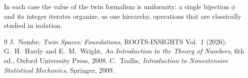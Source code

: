 \documentclass[11pt]{article}
\theoremstyle{definition}
\theoremstyle{remark}
\begin{document}
	In each case the value of the twin formalism is uniformity: a single bijection $\phi$ and its integer
	iterates organize, as one hierarchy, operations that are classically studied in isolation.
	
	\begin{thebibliography}{9}
		 J.~Nembe, \emph{Twin Spaces: Foundations}, ROOTS-INSIGHTS Vol.~1 (2026).
		 G.~H.~Hardy and E.~M.~Wright, \emph{An Introduction to the Theory of Numbers}, 6th ed., Oxford University Press, 2008.
		 C.~Tsallis, \emph{Introduction to Nonextensive Statistical Mechanics}, Springer, 2009.
	\end{thebibliography}
\end{document}
